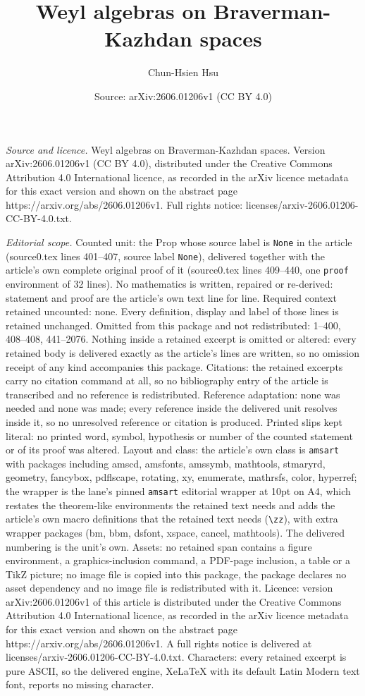 \documentclass[10pt,a4paper]{amsart}
\title[Weyl algebras on Braverman-Kazhdan spaces]{Weyl algebras on Braverman-Kazhdan spaces}
\author{Chun-Hsien Hsu}
\date{Source: arXiv:2606.01206v1 (CC BY 4.0)}
\begin{document}
\maketitle

\noindent\emph{Source and licence.} Weyl algebras on Braverman-Kazhdan spaces. Version arXiv:2606.01206v1 (CC BY 4.0), distributed under the Creative Commons Attribution 4.0 International licence, as recorded in the arXiv licence metadata for this exact version and shown on the abstract page https://arxiv.org/abs/2606.01206v1. Full rights notice: licenses/arxiv-2606.01206-CC-BY-4.0.txt.\par\smallskip

\noindent\textit{Editorial scope.} Counted unit: the Prop whose source label is \texttt{None} in the article (source0.tex lines 401--407, source label \texttt{None}), delivered together with the article's own complete original proof of it (source0.tex lines 409--440, one \texttt{proof} environment of 32 lines). No mathematics is written, repaired or re-derived: statement and proof are the article's own text line for line. Required context retained uncounted: none. Every definition, display and label of those lines is retained unchanged. Omitted from this package and not redistributed: 1--400, 408--408, 441--2076. Nothing inside a retained excerpt is omitted or altered: every retained body is delivered exactly as the article's lines are written, so no omission receipt of any kind accompanies this package. Citations: the retained excerpts carry no citation command at all, so no bibliography entry of the article is transcribed and no reference is redistributed. Reference adaptation: none was needed and none was made; every reference inside the delivered unit resolves inside it, so no unresolved reference or citation is produced. Printed slips kept literal: no printed word, symbol, hypothesis or number of the counted statement or of its proof was altered. Layout and class: the article's own class is \texttt{amsart} with packages including amscd, amsfonts, amssymb, mathtools, stmaryrd, geometry, fancybox, pdflscape, rotating, xy, enumerate, mathrsfs, color, hyperref; the wrapper is the lane's pinned \texttt{amsart} editorial wrapper at 10pt on A4, which restates the theorem-like environments the retained text needs and adds the article's own macro definitions that the retained text needs (\texttt{\textbackslash zz}), with extra wrapper packages (bm, bbm, dsfont, xspace, cancel, mathtools). The delivered numbering is the unit's own. Assets: no retained span contains a figure environment, a graphics-inclusion command, a PDF-page inclusion, a table or a TikZ picture; no image file is copied into this package, the package declares no asset dependency and no image file is redistributed with it. Licence: version arXiv:2606.01206v1 of this article is distributed under the Creative Commons Attribution 4.0 International licence, as recorded in the arXiv licence metadata for this exact version and shown on the abstract page https://arxiv.org/abs/2606.01206v1. A full rights notice is delivered at licenses/arxiv-2606.01206-CC-BY-4.0.txt. Characters: every retained excerpt is pure ASCII, so the delivered engine, XeLaTeX with its default Latin Modern text font, reports no missing character.
\end{document}

